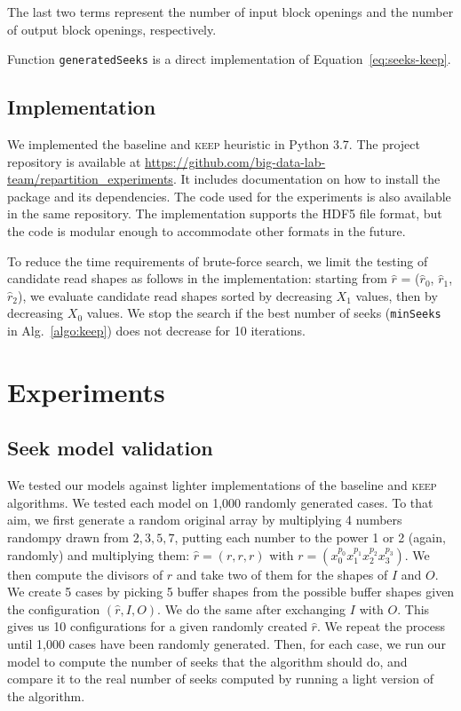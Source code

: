\documentclass[sigconf, nonacm]{acmart}
\newcommand{\keep}[0]{\textsc{keep}\xspace}
\begin{document}
 The last two terms represent the number of input block openings and the number
 of output block openings, respectively.

 Function
 \texttt{generatedSeeks} is
 a direct implementation of Equation~\ref{eq:seeks-keep}.

\subsection{Implementation}

We implemented the baseline and \keep heuristic in Python 3.7. The
project repository is available at
\url{https://github.com/big-data-lab-team/repartition_experiments}. It includes documentation on
how to install the package and its dependencies. The code used for the
experiments is also available in the same repository.
The implementation supports the HDF5 file format, but the code is modular
enough to accommodate other formats in the future.

To reduce the time requirements of brute-force search, we limit the testing
of candidate read shapes as follows in the implementation: starting from
$\hat r$ = ($\hat r_0$, $\hat r_1$, $\hat r_2$), we evaluate candidate read
shapes sorted by decreasing $X_1$ values, then by decreasing $X_0$ values.
We stop the search if the best number of seeks (\texttt{minSeeks} in
Alg.~\ref{algo:keep}) does not decrease for 10 iterations.

\section{Experiments}
\label{sec:experiments}
\subsection{Seek model validation}

We tested our models against lighter implementations of the baseline and \keep
algorithms. We tested each model on 1,000 randomly generated cases.
To that aim, we first generate a random original array by multiplying 4 numbers
randompy drawn from ${2, 3, 5, 7}$, putting each number to the power 1 or 2
(again, randomly) and multiplying them:
$\hat r = (r,r,r)$ with $r = (x_0^{p_0}x_1^{p_1}x_2^{p_2}x_3^{p_3})$.
We then compute the divisors of $r$ and take two of them for the shapes of $I$
and $O$. We create 5 cases by picking 5 buffer shapes from the possible buffer
shapes given the configuration $(\hat r, I, O)$. We do the same after exchanging
$I$ with $O$. This gives us 10 configurations for a given randomly created $\hat r$.
We repeat the process until 1,000 cases have been randomly generated.
Then, for each case, we run our model to compute the number of seeks that the algorithm
should do, and compare it to the real number of seeks computed by running a light version
of the algorithm.
\end{document}
